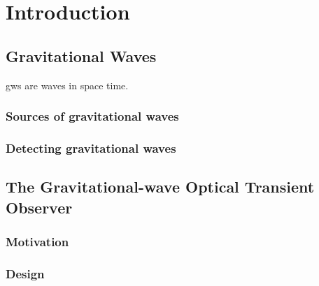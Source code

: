 \chapter{Introduction}
\label{chap:intro}
\chaptoc{}
\newpage

\section{Gravitational Waves}
\label{sec:gw}

\glspl{gw} are waves in space time.

\lipsum{}


\subsection{Sources of gravitational waves}
\label{sec:gw-sources}

\lipsum{}


\subsection{Detecting gravitational waves}
\label{sec:gw-detect}

\lipsum{}


\section{The Gravitational-wave Optical Transient Observer}
\label{sec:goto}

\lipsum{}

\subsection{Motivation}
\label{sec:gw-motivation}

\lipsum{}

\subsection{Design}
\label{sec:gw-design}

\lipsum{}
